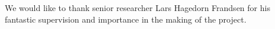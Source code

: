 We would like to thank senior researcher Lars Hagedorn Frandsen for his fantastic supervision and importance in the making of the project.